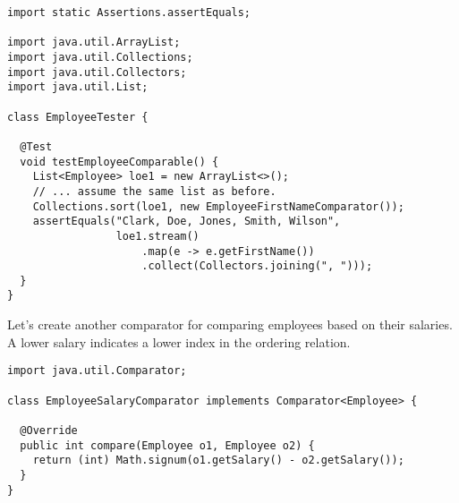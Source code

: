 \enlargethispage{2\baselineskip}
\begin{lstlisting}[language=MyJava]
import static Assertions.assertEquals;

import java.util.ArrayList;
import java.util.Collections;
import java.util.Collectors;
import java.util.List;

class EmployeeTester {

  @Test
  void testEmployeeComparable() {
    List<Employee> loe1 = new ArrayList<>();
    // ... assume the same list as before.
    Collections.sort(loe1, new EmployeeFirstNameComparator());
    assertEquals("Clark, Doe, Jones, Smith, Wilson",
                 loe1.stream()
                     .map(e -> e.getFirstName())
                     .collect(Collectors.joining(", ")));
  }
}
\end{lstlisting}

Let's create another comparator for comparing employees based on their salaries. 
A lower salary indicates a lower index in the ordering relation.

\begin{lstlisting}[language=MyJava]
import java.util.Comparator;

class EmployeeSalaryComparator implements Comparator<Employee> {

  @Override
  public int compare(Employee o1, Employee o2) {
    return (int) Math.signum(o1.getSalary() - o2.getSalary());
  }
}
\end{lstlisting}
